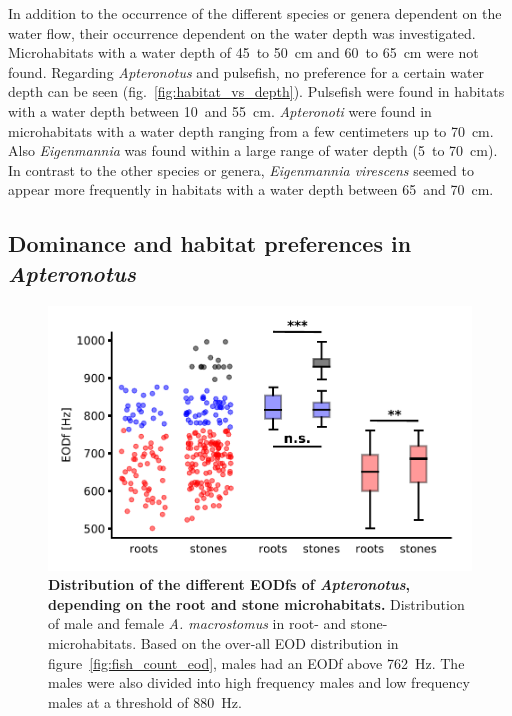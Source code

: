 In addition to the occurrence of the different species or genera dependent on the water flow, their occurrence dependent on the water depth was investigated. Microhabitats with a water depth of 45~to 50~cm and 60~to 65~cm were not found. Regarding \textit{Apteronotus} and pulsefish, no preference for a certain water depth can be seen (fig.~\ref{fig:habitat_vs_depth}). Pulsefish were found in habitats with a water depth between 10~and 55~cm. \textit{Apteronoti} were found in microhabitats with a water depth ranging from a few centimeters up to 70~cm. Also \textit{Eigenmannia} was found within a large range of water depth (5~to 70~cm). In contrast to the other species or genera, \textit{Eigenmannia virescens} seemed to appear more frequently in habitats with a water depth between 65~and 70~cm.



\subsection{Dominance and habitat preferences in \textit{Apteronotus}}

\begin{figure}[H]
    \centering
    \includegraphics{pictures/Results/eod_habitat.pdf}
    \caption{\textbf{Distribution of the different EODfs of \textit{Apteronotus}, depending on the root and stone microhabitats.} Distribution of male and female \textit{A. macrostomus} in root- and stone-microhabitats. Based on the over-all EOD distribution in figure~\ref{fig:fish_count_eod}, males had an EODf above 762~Hz. The males were also divided into high frequency males and low frequency males at a threshold of 880~Hz.}
    \label{fig:habitat_vs_eod}
\end{figure}

